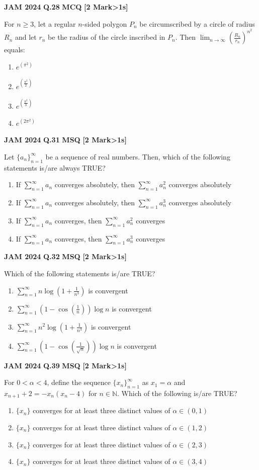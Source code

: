 \documentclass[11pt,a4paper]{article}
\newcommand{\pyqheader}[4]{%
    \noindent\begin{tcolorbox}[
        colback=badgebg,
        colframe=secondary,
        arc=2mm,
        boxrule=0.6pt,
        top=1.5mm,bottom=1.5mm,left=2mm,right=2mm
    ]
        \textbf{\textcolor{primary}{JAM #1}} \hfill \textbf{Q.#2} \hfill \textsc{\textbf{#3}} \hfill \textbf{[#4 Mark\ifnum#4>1s\fi]}
    \end{tcolorbox}\vspace{-1mm}
}
\begin{document}
\pyqheader{2024}{28}{MCQ}{2}
For $n\ge 3$, let a regular $n$-sided polygon $P_{n}$ be circumscribed by a circle of radius $R_{n}$ and let $r_{n}$ be the radius of the circle inscribed in $P_{n}$. Then $\lim_{n\rightarrow\infty}\left(\frac{R_{n}}{r_{n}}\right)^{n^{2}}$ equals:
\begin{enumerate}[label=(\Alph*)]
    \item $e^{(\pi^{2})}$
    \item $e^{(\frac{\pi^{2}}{2})}$
    \item $e^{(\frac{\pi^{2}}{3})}$
    \item $e^{(2\pi^{2})}$
\end{enumerate}

\pyqheader{2024}{31}{MSQ}{2}
Let $\{a_{n}\}_{n=1}^{\infty}$ be a sequence of real numbers. Then, which of the following statements is/are always TRUE?
\begin{enumerate}[label=(\Alph*)]
    \item If $\sum_{n=1}^{\infty} a_{n}$ converges absolutely, then $\sum_{n=1}^{\infty} a_{n}^{2}$ converges absolutely
    \item If $\sum_{n=1}^{\infty} a_{n}$ converges absolutely, then $\sum_{n=1}^{\infty} a_{n}^{3}$ converges absolutely
    \item If $\sum_{n=1}^{\infty} a_{n}$ converges, then $\sum_{n=1}^{\infty} a_{n}^{2}$ converges
    \item If $\sum_{n=1}^{\infty} a_{n}$ converges, then $\sum_{n=1}^{\infty} a_{n}^{3}$ converges
\end{enumerate}

\pyqheader{2024}{32}{MSQ}{2}
Which of the following statements is/are TRUE?
\begin{enumerate}[label=(\Alph*)]
    \item $\sum_{n=1}^{\infty}n\log(1+\frac{1}{n^{3}})$ is convergent
    \item $\sum_{n=1}^{\infty}(1-\cos(\frac{1}{n}))\log n$ is convergent
    \item $\sum_{n=1}^{\infty}n^{2}\log(1+\frac{1}{n^{3}})$ is convergent
    \item $\sum_{n=1}^{\infty}(1-\cos(\frac{1}{\sqrt{n}}))\log n$ is convergent
\end{enumerate}

\pyqheader{2024}{39}{MSQ}{2}
For $0<\alpha<4$, define the sequence $\{x_{n}\}_{n=1}^{\infty}$ as $x_{1}=\alpha$ and $x_{n+1}+2=-x_{n}(x_{n}-4)$ for $n\in\mathbb{N}$. Which of the following is/are TRUE?
\begin{enumerate}[label=(\Alph*)]
    \item $\{x_{n}\}$ converges for at least three distinct values of $\alpha\in(0,1)$
    \item $\{x_{n}\}$ converges for at least three distinct values of $\alpha\in(1,2)$
    \item $\{x_{n}\}$ converges for at least three distinct values of $\alpha\in(2,3)$
    \item $\{x_{n}\}$ converges for at least three distinct values of $\alpha\in(3,4)$
\end{enumerate}
\end{document}
